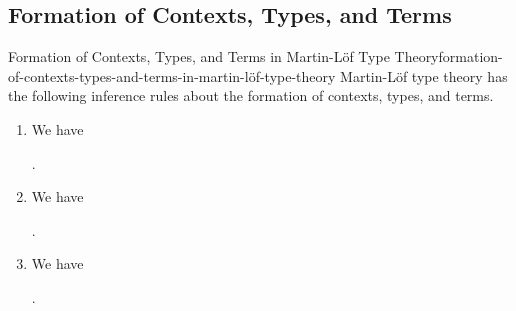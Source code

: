 \subsection{Formation of Contexts, Types, and Terms}\label{subsection-formation-of-contexts-types-and-terms}
\begin{definition}{Formation of Contexts, Types, and Terms in Martin-Löf Type Theory}{formation-of-contexts-types-and-terms-in-martin-löf-type-theory}%
    Martin-Löf type theory has the following inference rules about the formation of contexts, types, and terms.
    \begin{enumerate}
        \item\label{formation-of-contexts-types-and-terms-in-martin-löf-type-theory-formation-of-dependent-types}We have
            \begin{webprooftree}%
                \begin{prooftree}%
                \end{prooftree}%
                .%
            \end{webprooftree}%
        \item\label{formation-of-contexts-types-and-terms-in-martin-löf-type-theory-formation-of-judgemental-equality-of-types-1}We have
            \begin{webprooftree}%
                \begin{prooftree}%
                \end{prooftree}%
                .%
            \end{webprooftree}%
        \item\label{formation-of-contexts-types-and-terms-in-martin-löf-type-theory-formation-of-judgemental-equality-of-types-1}We have
            \begin{webprooftree}%
                \begin{prooftree}%
                \end{prooftree}%
                .%
            \end{webprooftree}%

\end{enumerate}
\end{definition}
